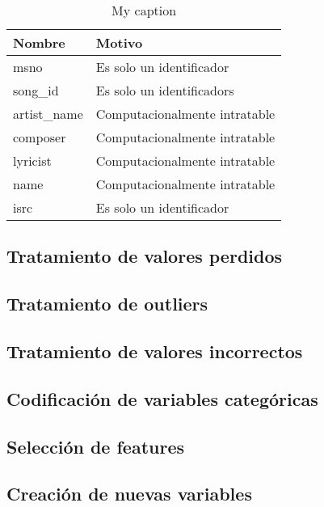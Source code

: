 \documentclass[a4paper]{article}
\begin{document}
\begin{table}[H]
\centering
\caption{My caption}
\label{my-label}
\begin{tabular}{|l|l|}
\hline
Nombre                   & Motivo \\ \hline
msno                     & Es solo un identificador \\ \hline
song\_id                 & Es solo un identificadors \\ \hline
artist\_name             & Computacionalmente intratable \\ \hline
composer                 & Computacionalmente intratable \\ \hline
lyricist                 & Computacionalmente intratable    \\ \hline
name                     & Computacionalmente intratable     \\ \hline
isrc                     & Es solo un identificador    \\ \hline
\end{tabular}
\end{table}


\subsection{Tratamiento de valores perdidos}

\subsection{Tratamiento de outliers}

\subsection{Tratamiento de valores incorrectos}

\subsection{Codificación de variables categóricas}


\subsection{Selección de features}

\subsection{Creación de nuevas variables}
\end{document}
